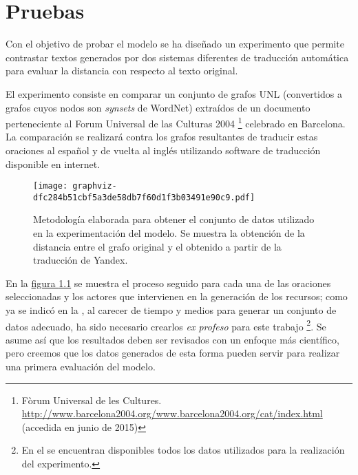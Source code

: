 \documentclass[a4paper,12pt,spanish]{book}
\begin{document}
\chapter{Pruebas}
\label{5.pruebas/index::doc}\label{5.pruebas/index:pruebas}
Con el objetivo de probar el modelo se ha diseñado un experimento que permite
contrastar textos generados por dos sistemas diferentes de traducción automática
para evaluar la distancia con respecto al texto original.

El experimento consiste en comparar un conjunto de grafos UNL
(convertidos a grafos cuyos nodos son \emph{synsets} de WordNet) extraídos de un
documento perteneciente al Forum Universal de las Culturas 2004 \footnote{
Fòrum Universal de les Cultures.
\href{http://www.barcelona2004.org/www.barcelona2004.org/cat/index.html}{http://www.barcelona2004.org/www.barcelona2004.org/cat/index.html}
(accedida en junio de 2015)
} celebrado
en Barcelona. La comparación se realizará contra los grafos resultantes de traducir
estas oraciones al español y de vuelta al inglés utilizando software de traducción
disponible en internet.
\begin{figure}[htbp]
\centering
\capstart

\texttt{[image: graphviz-dfc284b51cbf5a3de58db7f60d1f3b03491e90c9.pdf]}
\caption[Metodología elaborada para obtener el conjunto de datos utilizado en la experimentación del modelo.]{Metodología elaborada para obtener el conjunto de datos utilizado en la experimentación del modelo. Se muestra la obtención de la distancia entre el grafo original y el obtenido a partir de la traducción de Yandex.}\label{5.pruebas/index:fig-experiment-layout}\end{figure}

En la \hyperref[5.pruebas/index:fig-experiment-layout]{figura  \ref*{5.pruebas/index:fig-experiment-layout}} se muestra el proceso seguido para cada
una de las oraciones seleccionadas y los actores que intervienen en la generación de
los recursos; como ya se indicó en la {\hyperref[2.problem/index:planteamiento-problema]{\emph{}}}, al
carecer de tiempo y medios para generar un conjunto de datos adecuado, ha sido
necesario crearlos \emph{ex profeso} para este trabajo \footnote{
En el {\hyperref[appendix-data:appendix-data]{\emph{}}} se encuentran disponibles todos los datos
utilizados para la realización del experimento.
}. Se asume así que los resultados
deben ser revisados con un enfoque más científico, pero creemos que los datos generados
de esta forma pueden servir para realizar una primera evaluación del modelo.
\end{document}
